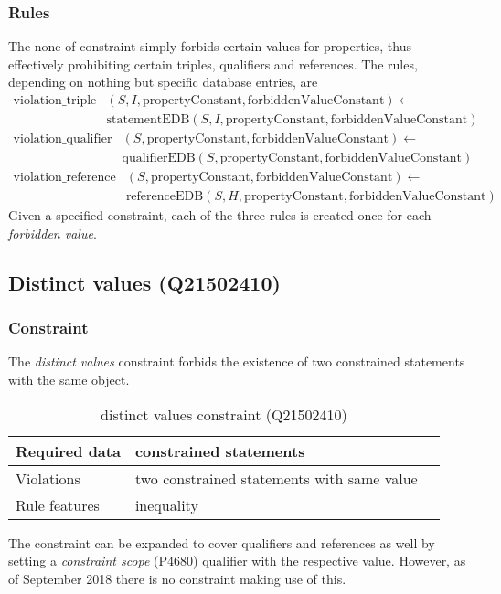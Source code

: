 \documentclass[hyperref,bachelorofscience,fleqn]{cgvpub}
\begin{document}
\subsubsection{Rules}
The none of constraint simply forbids certain values for properties, thus effectively prohibiting certain triples, qualifiers and references. The rules, depending on nothing but specific database entries, are
\begin{equation*}
\begin{split}
\text{violation\_triple}&(S, I, \text{propertyConstant}, \text{forbiddenValueConstant}) \leftarrow \\
&\text{statementEDB}(S, I, \text{propertyConstant}, \text{forbiddenValueConstant})
\end{split}
\end{equation*}
\begin{equation*}
\begin{split}
\text{violation\_qualifier}&(S, \text{propertyConstant}, \text{forbiddenValueConstant}) \leftarrow \\
&\text{qualifierEDB}(S, \text{propertyConstant}, \text{forbiddenValueConstant})
\end{split}
\end{equation*}
\begin{equation*}
\begin{split}
\text{violation\_reference}&(S, \text{propertyConstant}, \text{forbiddenValueConstant}) \leftarrow \\
&\text{referenceEDB}(S, H, \text{propertyConstant}, \text{forbiddenValueConstant})
\end{split}
\end{equation*}
Given a specified constraint, each of the three rules is created once for each \emph{forbidden value}.


\subsection{Distinct values (Q21502410)}
\subsubsection{Constraint}
The \emph{distinct values} constraint forbids the existence of two constrained statements with the same object.
\begin{table}[H]
\caption{distinct values constraint (Q21502410)}
\begin{tabularx}{\textwidth}{ ll X}
\hline
Required data & constrained statements \\
\hline
Violations & two constrained statements with same value \\
\hline
Rule features & inequality \\
\hline
\end{tabularx}
\end{table}
The constraint can be expanded to cover qualifiers and references as well by setting a \emph{constraint scope} (P4680) qualifier with the respective value. However, as of September 2018 there is no constraint making use of this.
\end{document}
